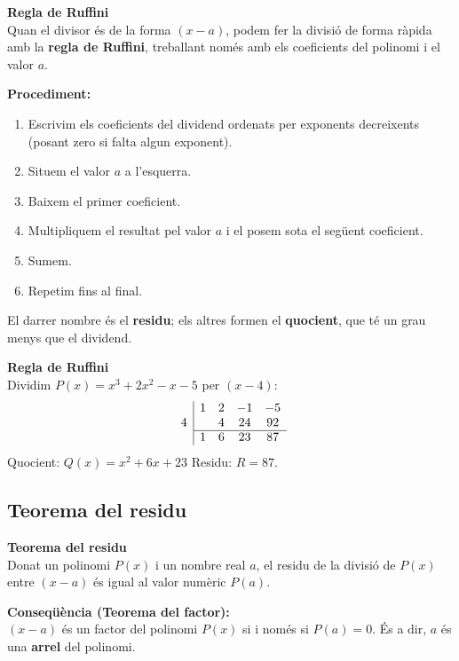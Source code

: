 \documentclass[12pt]{article}
\begin{document}
\begin{concept}
\textbf{Regla de Ruffini}\\
Quan el divisor és de la forma $(x-a)$, podem fer la divisió de forma ràpida amb la \textbf{regla de Ruffini}, treballant només amb els coeficients del polinomi i el valor $a$.

\textbf{Procediment:}
\begin{enumerate}
    \item Escrivim els coeficients del dividend ordenats per exponents decreixents (posant zero si falta algun exponent).
    \item Situem el valor $a$ a l'esquerra.
    \item Baixem el primer coeficient.
    \item Multipliquem el resultat pel valor $a$ i el posem sota el següent coeficient.
    \item Sumem.
    \item Repetim fins al final.
\end{enumerate}
El darrer nombre és el \textbf{residu}; els altres formen el \textbf{quocient}, que té un grau menys que el dividend.
\end{concept}

\begin{exemple}
\textbf{Regla de Ruffini}\\
Dividim $P(x) = x^3 + 2x^2 - x - 5$ per $(x-4)$:
\[
\begin{array}{c|cccc}
    & 1 & 2 & -1 & -5 \\
4   &   & 4 & 24 & 92 \\
\cline{2-5}
    & 1 & 6 & 23 & 87 \\
\end{array}
\]
Quocient: $Q(x) = x^2 + 6x + 23$ \quad Residu: $R = 87$.
\end{exemple}

\subsection{Teorema del residu}

\begin{concept}
\textbf{Teorema del residu}\\
Donat un polinomi $P(x)$ i un nombre real $a$, el residu de la divisió de $P(x)$ entre $(x-a)$ és igual al valor numèric $P(a)$.

\textbf{Conseqüència (Teorema del factor):}\\
$(x-a)$ és un factor del polinomi $P(x)$ si i només si $P(a) = 0$. És a dir, $a$ és una \textbf{arrel} del polinomi.
\end{concept}
\end{document}
